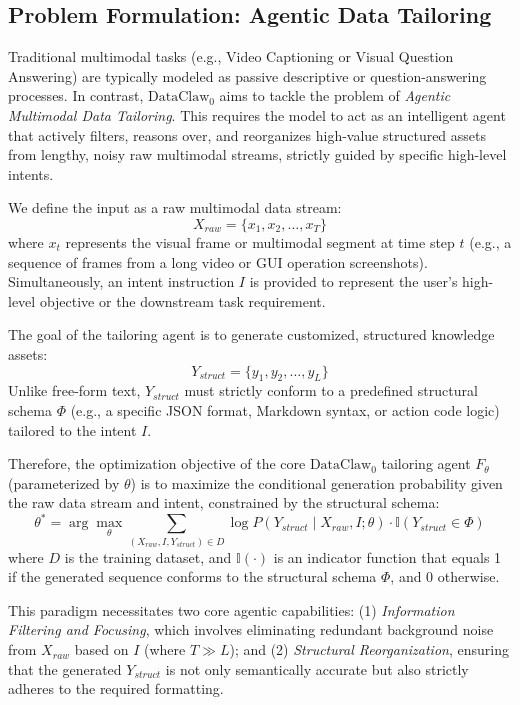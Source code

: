 \documentclass{llmxive}
\begin{document}
\subsection{Problem Formulation: Agentic Data Tailoring}

Traditional multimodal tasks (e.g., Video Captioning or Visual Question Answering) are typically modeled as passive descriptive or question-answering processes. In contrast, $\text{DataClaw}_0$ aims to tackle the problem of \textit{Agentic Multimodal Data Tailoring}. This requires the model to act as an intelligent agent that actively filters, reasons over, and reorganizes high-value structured assets from lengthy, noisy raw multimodal streams, strictly guided by specific high-level intents.

We define the input as a raw multimodal data stream:
\begin{equation}
X_{raw} = \{x_1, x_2, \dots, x_T\}
\end{equation}
where \(x_t\) represents the visual frame or multimodal segment at time step \(t\) (e.g., a sequence of frames from a long video or GUI operation screenshots). Simultaneously, an intent instruction \(I\) is provided to represent the user's high-level objective or the downstream task requirement.

The goal of the tailoring agent is to generate customized, structured knowledge assets:
\begin{equation}
Y_{struct} = \{y_1, y_2, \dots, y_L\}
\end{equation}
Unlike free-form text, \(Y_{struct}\) must strictly conform to a predefined structural schema \(\Phi\) (e.g., a specific JSON format, Markdown syntax, or action code logic) tailored to the intent \(I\).

Therefore, the optimization objective of the core $\text{DataClaw}_0$ tailoring agent \(F_\theta\) (parameterized by \(\theta\)) is to maximize the conditional generation probability given the raw data stream and intent, constrained by the structural schema:
\begin{equation}
\theta^* = \arg\max\limits_\theta \sum\limits_{(X_{raw},I,Y_{struct})\in D} \log P(Y_{struct}\mid X_{raw},I;\theta)\cdot \mathbb{I}(Y_{struct}\in\Phi)
\end{equation}
where \(D\) is the training dataset, and \(\mathbb{I}(\cdot)\) is an indicator function that equals 1 if the generated sequence conforms to the structural schema \(\Phi\), and 0 otherwise.

This paradigm necessitates two core agentic capabilities: (1) \textit{Information Filtering and Focusing}, which involves eliminating redundant background noise from \(X_{raw}\) based on \(I\) (where \(T \gg L\)); and (2) \textit{Structural Reorganization}, ensuring that the generated \(Y_{struct}\) is not only semantically accurate but also strictly adheres to the required formatting.
\end{document}
